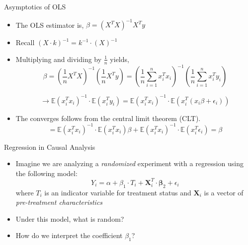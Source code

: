 \documentclass[handout]{beamer}
\begin{document}
\begin{frame}{Asymptotics of OLS }
\begin{itemize}
\item The OLS estimator is, $\beta = \left( X^TX \right)^{-1} X^T y$
\item Recall $\left( X \cdot k \right)^{-1} = k^{-1} \cdot \left( X \right)^{-1}$
\item Multiplying and dividing by $\frac{1}{n}$ yields, 
$$\beta = \left( \frac{1}{n} X^TX \right)^{-1} \left( \frac{1}{n} X^T y \right) 
= \left( \frac{1}{n} \sum_{i=1}^n x_i^T x_i \right)^{-1} \left( \frac{1}{n} \sum_{i=1}^n x_i^T y_i \right)$$

\[ \rightarrow \mathbb{E}\left(x_i^T x_i\right)^{-1}\cdot \mathbb{E}\left( x_i^T y_i\right) 
 = \mathbb{E}\left(x_i^T x_i\right)^{-1}\cdot \mathbb{E}\left( x_i^T \left(x_i \beta + \epsilon_i \right) \right) \]
\item The converges follows from the central limit theorem (CLT). 
\[ = \mathbb{E}\left(x_i^T x_i\right)^{-1} \cdot \mathbb{E}\left( x_i^T x_i\right) \beta
+\mathbb{E}\left(x_i^T x_i\right)^{-1} \cdot \mathbb{E}\left( x_i^T \epsilon_i\right) = \beta \] 
\end{itemize}
\end{frame}


\begin{frame}{Regression in  Causal Analysis}
	\begin{itemize}
\item Imagine we are analyzing a \emph{randomized} experiment with a regression using the following model:
		$$Y_i=\alpha + \beta_1 \cdot T_i + \mathbf{X}^T_i\cdot \mathbf{\beta}_2+\epsilon_i$$
		where $T_i$ is an indicator variable for treatment status and $\mathbf{X}_i$ is a vector of \emph{pre-treatment characteristics}
\item<+-> Under this model, what is random?  
\item<+-> How do we interpret the coefficient  $\beta_1$? 
	\end{itemize}
\end{frame}
\end{document}

